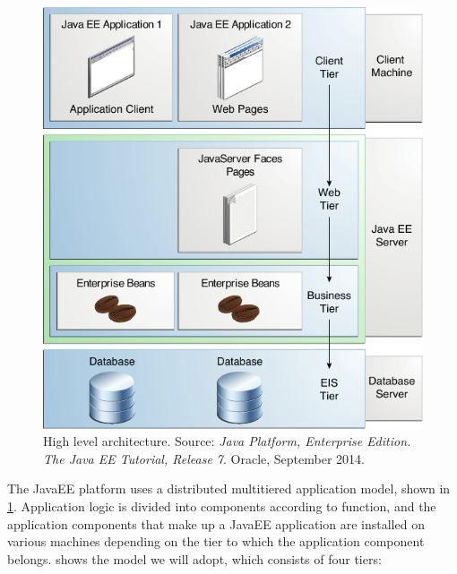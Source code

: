 \begin{figure}%
	\centering%
	\includegraphics[width=0.85\linewidth]{img/JEETT}%
	\caption{High level architecture. Source: \emph{Java Platform, Enterprise Edition. The Java EE Tutorial, Release 7}. Oracle, September 2014.}\label{fig:jeett}%
\end{figure}

The JavaEE platform uses a distributed multitiered application model, shown in \cref{fig:jeett}. Application logic is divided into components according to function, and the application components that make up a JavaEE application are installed on various machines depending on the tier to which the application component belongs.  shows the model we will adopt, which consists of four tiers:

